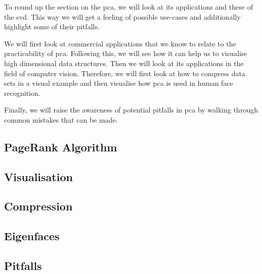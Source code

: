 To round up the section on the \acrlong{pca}, we will look at its applications and these of the \acrlong{svd}.
This way we will get a feeling of possible use-cases and additionally highlight some of their pitfalls.

We will first look at commercial applications that we know to relate to the practicability of \gls{pca}.
Following this, we will see how it can help us to visualise high dimensional data structures.
Then we will look at its applications in the field of computer vision.
Therefore, we will first look at how to compress data sets in a visual example and then visualise how \gls{pca} is used in human face recognition.

Finally, we will raise the awareness of potential pitfalls in \gls{pca} by walking through common mistakes that can be made.


\subsection{PageRank Algorithm}

\clearpage

\subsection{Visualisation}

\clearpage

\subsection{Compression}

\clearpage

\subsection{Eigenfaces} \label{sec:eigenfaces}

\clearpage

\subsection{Pitfalls}

\clearpage

